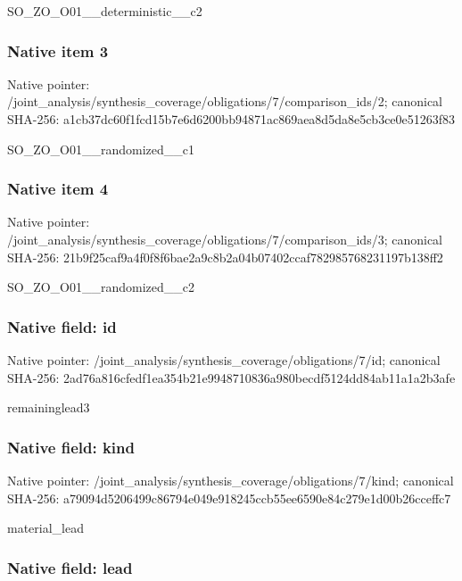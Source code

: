 \documentclass[10pt,a4paper]{article}
\begin{document}
SO\_ZO\_O01\_\_deterministic\_\_c2


\subsubsection{Native item 3}


Native pointer: /joint\_analysis/synthesi\allowbreak{}s\_coverage/obligations/7\allowbreak{}/comparison\_ids/2; canonical SHA-256: a1cb37dc60f1fcd15b7e6d62\allowbreak{}00bb94871ac869aea8d5da8e\allowbreak{}5cb3ce0e51263f83


SO\_ZO\_O01\_\_randomized\_\_c1


\subsubsection{Native item 4}


Native pointer: /joint\_analysis/synthesi\allowbreak{}s\_coverage/obligations/7\allowbreak{}/comparison\_ids/3; canonical SHA-256: 21b9f25caf9a4f0f8f6bae2a\allowbreak{}9c8b2a04b07402ccaf782985\allowbreak{}768231197b138ff2


SO\_ZO\_O01\_\_randomized\_\_c2


\subsubsection{Native field: id}


Native pointer: /joint\_analysis/synthesi\allowbreak{}s\_coverage/obligations/7\allowbreak{}/id; canonical SHA-256: 2ad76a816cfedf1ea354b21e\allowbreak{}9948710836a980becdf5124d\allowbreak{}d84ab11a1a2b3afe


remaininglead3


\subsubsection{Native field: kind}


Native pointer: /joint\_analysis/synthesi\allowbreak{}s\_coverage/obligations/7\allowbreak{}/kind; canonical SHA-256: a79094d5206499c86794e049\allowbreak{}e918245ccb55ee6590e84c27\allowbreak{}9e1d00b26cceffc7


material\_lead


\subsubsection{Native field: lead}
\end{document}
